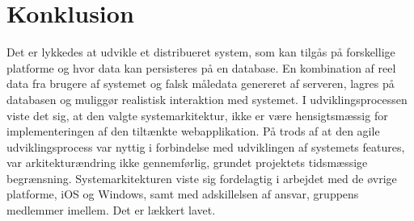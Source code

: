 \chapter{Konklusion}
Det er lykkedes at udvikle et distribueret system, som kan tilgås på forskellige platforme og hvor data kan persisteres på en database. En kombination af reel data fra brugere af systemet og falsk måledata genereret af serveren, lagres på databasen og muliggør realistisk interaktion med systemet. I udviklingsprocessen viste det sig, at den valgte systemarkitektur, ikke er være hensigtsmæssig for implementeringen af den tiltænkte webapplikation. På trods af at den agile udviklingsprocess var nyttig i forbindelse med udviklingen af systemets features, var arkitekturændring ikke gennemførlig, grundet projektets tidsmæssige begrænsning. Systemarkitekturen viste sig fordelagtig i arbejdet med de øvrige platforme, iOS og Windows, samt med adskillelsen af ansvar, gruppens medlemmer imellem. Det er lækkert lavet.

%
%
%
%
%
%
